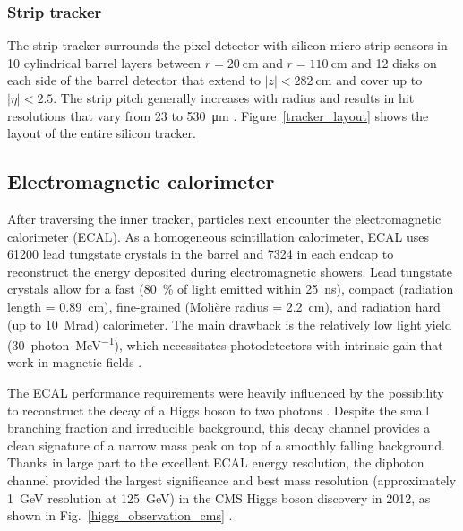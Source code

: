 


\subsubsection{Strip tracker}
The strip tracker surrounds the pixel detector with silicon micro-strip sensors in 10 cylindrical barrel layers between $r=\SI{20}{\cm}$ and $r=\SI{110}{\cm}$ and 12 disks on each side of the barrel detector that extend to $|z|<\SI{282}{\cm}$ and cover up to $|\eta|<2.5$. The strip pitch generally increases with radius and results in hit resolutions that vary from \num{23} to \SI{530}{\um} \cite{cms_experiment}. Figure~\ref{tracker_layout} shows the layout of the entire silicon tracker.




\subsection{Electromagnetic calorimeter}
After traversing the inner tracker, particles next encounter the electromagnetic calorimeter (ECAL). As a homogeneous scintillation calorimeter, ECAL uses \num{61200} lead tungstate crystals in the barrel and \num{7324} in each endcap to reconstruct the energy deposited during electromagnetic showers. Lead tungstate crystals allow for a fast (\SI{80}{\percent} of light emitted within \SI{25}{\ns}), compact (radiation length = \SI{0.89}{cm}), fine-grained (Moli\`ere radius = \SI{2.2}{\cm}), and radiation hard (up to \SI{10}{\mega rad}) calorimeter. The main drawback is the relatively low light yield (\SI{30}{photon\per\mega\electronvolt}), which necessitates photodetectors with intrinsic gain that work in magnetic fields \cite{cms_experiment, cms_tdr_v1}.

The ECAL performance requirements were heavily influenced by the possibility to reconstruct the decay of a Higgs boson to two photons \cite{cms_tdr_v2}. Despite the small branching fraction and irreducible background, this decay channel provides a clean signature of a narrow mass peak on top of a smoothly falling background. Thanks in large part to the excellent ECAL energy resolution, the diphoton channel provided the largest significance and best mass resolution (approximately \SI{1}{\GeV} resolution at \SI{125}{\GeV}) in the CMS Higgs boson discovery in 2012, as shown in Fig.~\ref{higgs_observation_cms} \cite{cms_higgs}.

